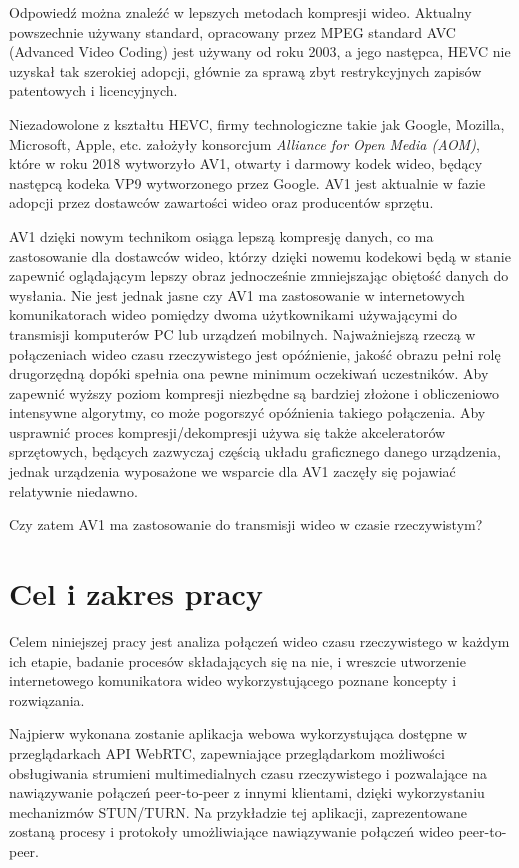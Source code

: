 Odpowiedź można znaleźć w lepszych metodach kompresji wideo. Aktualny powszechnie używany standard,
opracowany przez MPEG standard AVC (Advanced Video Coding) jest używany od roku 2003, a jego
następca, HEVC nie uzyskał tak szerokiej adopcji, głównie za sprawą zbyt restrykcyjnych zapisów
patentowych i licencyjnych.

Niezadowolone z kształtu HEVC, firmy technologiczne takie jak Google, Mozilla, Microsoft, Apple,
etc. założyły konsorcjum \emph{Alliance for Open Media (AOM)}, które w roku 2018 wytworzyło AV1,
otwarty i darmowy kodek wideo, będący następcą kodeka VP9 wytworzonego przez Google. AV1 jest
aktualnie w fazie adopcji przez dostawców zawartości wideo oraz producentów sprzętu.

AV1 dzięki nowym technikom osiąga lepszą kompresję danych, co ma zastosowanie dla dostawców wideo,
którzy dzięki nowemu kodekowi będą w stanie zapewnić oglądającym lepszy obraz jednocześnie
zmniejszając obiętość danych do wysłania. Nie jest jednak jasne czy AV1 ma zastosowanie w
internetowych komunikatorach wideo pomiędzy dwoma użytkownikami używającymi do transmisji komputerów
PC lub urządzeń mobilnych. Najważniejszą rzeczą w połączeniach wideo czasu rzeczywistego jest
opóźnienie, jakość obrazu pełni rolę drugorzędną dopóki spełnia ona pewne minimum oczekiwań
uczestników. Aby zapewnić wyższy poziom kompresji niezbędne są bardziej złożone i obliczeniowo
intensywne algorytmy, co może pogorszyć opóźnienia takiego połączenia. Aby usprawnić proces
kompresji/dekompresji używa się także akceleratorów sprzętowych, będących zazwyczaj częścią układu
graficznego danego urządzenia, jednak urządzenia wyposażone we wsparcie dla AV1 zaczęły się pojawiać
relatywnie niedawno.

Czy zatem AV1 ma zastosowanie do transmisji wideo w czasie rzeczywistym?

\section{Cel i zakres pracy}
Celem niniejszej pracy jest analiza połączeń wideo czasu rzeczywistego w każdym ich etapie, badanie
procesów składających się na nie, i wreszcie utworzenie internetowego komunikatora wideo
wykorzystującego poznane koncepty i rozwiązania.

Najpierw wykonana zostanie aplikacja webowa wykorzystująca dostępne w przeglądarkach API WebRTC,
zapewniające przeglądarkom możliwości obsługiwania strumieni multimedialnych czasu rzeczywistego i
pozwalające na nawiązywanie połączeń peer-to-peer z innymi klientami, dzięki wykorzystaniu
mechanizmów STUN/TURN. Na przykładzie tej aplikacji, zaprezentowane zostaną procesy i protokoły
umożliwiające nawiązywanie połączeń wideo peer-to-peer.

